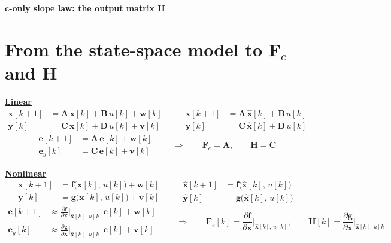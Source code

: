 \documentclass[11pt,a4paper]{ctexart}
\newcommand{\hd}[1]{\par\bigskip\noindent\underline{\textbf{#1}}}
\begin{document}
\begin{center}\textbf{\large c-only slope law: the output matrix $\mathbf{H}$}\end{center}

\section{From the state-space model to $\mathbf{F}_e$ and $\mathbf{H}$}

\hd{Linear}
\[
\begin{aligned}
\mathbf{x}[k+1] &= \mathbf{A}\,\mathbf{x}[k] + \mathbf{B}\,u[k] + \mathbf{w}[k] \\
\mathbf{y}[k] &= \mathbf{C}\,\mathbf{x}[k] + \mathbf{D}\,u[k] + \mathbf{v}[k]
\end{aligned}
\qquad
\begin{aligned}
\hat{\mathbf{x}}[k+1] &= \mathbf{A}\,\hat{\mathbf{x}}[k] + \mathbf{B}\,u[k] \\
\hat{\mathbf{y}}[k] &= \mathbf{C}\,\hat{\mathbf{x}}[k] + \mathbf{D}\,u[k]
\end{aligned}
\]
\[
\begin{aligned}
\mathbf{e}[k+1] &= \mathbf{A}\,\mathbf{e}[k] + \mathbf{w}[k] \\
\mathbf{e}_y[k] &= \mathbf{C}\,\mathbf{e}[k] + \mathbf{v}[k]
\end{aligned}
\qquad\Longrightarrow\qquad
\mathbf{F}_e = \mathbf{A}, \qquad \mathbf{H} = \mathbf{C}
\]

\hd{Nonlinear}
\[
\begin{aligned}
\mathbf{x}[k+1] &= \mathbf{f}\big(\mathbf{x}[k],\,u[k]\big) + \mathbf{w}[k] \\
\mathbf{y}[k] &= \mathbf{g}\big(\mathbf{x}[k],\,u[k]\big) + \mathbf{v}[k]
\end{aligned}
\qquad
\begin{aligned}
\hat{\mathbf{x}}[k+1] &= \mathbf{f}\big(\hat{\mathbf{x}}[k],\,u[k]\big) \\
\hat{\mathbf{y}}[k] &= \mathbf{g}\big(\hat{\mathbf{x}}[k],\,u[k]\big)
\end{aligned}
\]
\[
\begin{aligned}
\mathbf{e}[k+1] &\approx \frac{\partial\mathbf{f}}{\partial\mathbf{x}}\bigg|_{\hat{\mathbf{x}}[k],\,u[k]}\mathbf{e}[k] + \mathbf{w}[k] \\
\mathbf{e}_y[k] &\approx \frac{\partial\mathbf{g}}{\partial\mathbf{x}}\bigg|_{\hat{\mathbf{x}}[k],\,u[k]}\mathbf{e}[k] + \mathbf{v}[k]
\end{aligned}
\qquad\Longrightarrow\qquad
\mathbf{F}_e[k] = \frac{\partial\mathbf{f}}{\partial\mathbf{x}}\bigg|_{\hat{\mathbf{x}}[k],\,u[k]}, \qquad
\mathbf{H}[k] = \frac{\partial\mathbf{g}}{\partial\mathbf{x}}\bigg|_{\hat{\mathbf{x}}[k],\,u[k]}
\]
\end{document}
